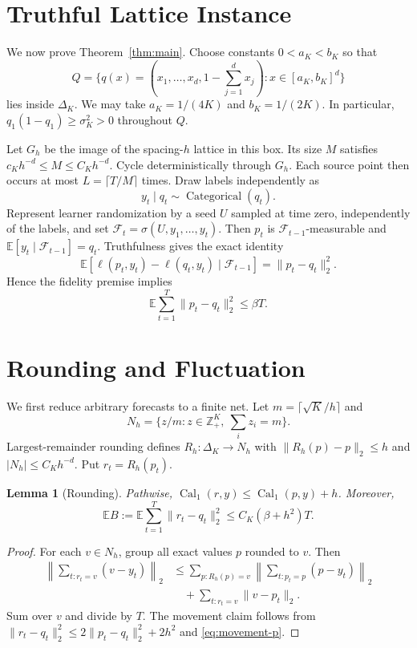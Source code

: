 \documentclass[twoside]{article}
\newtheorem{lemma}{Lemma}
\newcommand{\E}{\mathbb E}
\newcommand{\calone}{\operatorname{Cal}_1}
\newcommand{\simplex}{\Delta_K}
\newcommand{\1}{\mathbf 1}
\begin{document}
\section{Truthful Lattice Instance}

We now prove Theorem~\ref{thm:main}. Choose constants $0<a_K<b_K$ so that \[ Q=\{q(x)=(x_1,\ldots,x_d,1-\textstyle\sum_{j=1}^d x_j): x\in[a_K,b_K]^d\} \] lies inside $\simplex$. We may take $a_K=1/(4K)$ and $b_K=1/(2K)$. In particular, $q_1(1-q_1)\geq\sigma_K^2>0$ throughout $Q$.

Let $G_h$ be the image of the spacing-$h$ lattice in this box. Its size $M$ satisfies $c_Kh^{-d}\leq M\leq C_Kh^{-d}$. Cycle deterministically through $G_h$. Each source point then occurs at most $L=\lceil T/M\rceil$ times. Draw labels independently as \[ y_t\mid q_t\sim\operatorname{Categorical}(q_t). \] Represent learner randomization by a seed $U$ sampled at time zero, independently of the labels, and set $\mathcal F_t=\sigma(U,y_1,\ldots,y_t)$. Then $p_t$ is $\mathcal F_{t-1}$-measurable and $\E[y_t\mid\mathcal F_{t-1}]=q_t$. Truthfulness gives the exact identity \[ \E[\ell(p_t,y_t)-\ell(q_t,y_t)\mid\mathcal F_{t-1}] =\|p_t-q_t\|_2^2. \] Hence the fidelity premise implies
\begin{equation}\label{eq:movement-p}
 \E\sum_{t=1}^T\|p_t-q_t\|_2^2\leq\beta T.
\end{equation}

\section{Rounding and Fluctuation}

We first reduce arbitrary forecasts to a finite net. Let $m=\lceil\sqrt K/h\rceil$ and \[ N_h=\{z/m:z\in\mathbb Z_+^K,\ \sum_i z_i=m\}. \] Largest-remainder rounding defines $R_h:\simplex\to N_h$ with $\|R_h(p)-p\|_2\leq h$ and $|N_h|\leq C_Kh^{-d}$. Put $r_t=R_h(p_t)$.

\begin{lemma}[Rounding]\label{lem:rounding}
Pathwise, $\calone(r,y)\leq\calone(p,y)+h$. Moreover, \[ \E B:=\E\sum_{t=1}^T\|r_t-q_t\|_2^2 \leq C_K(\beta+h^2)T. \]
\end{lemma}

\begin{proof}
For each $v\in N_h$, group all exact values $p$ rounded to $v$. Then
\begin{align*}
 \left\|\sum_{t:r_t=v}(v-y_t)\right\|_2
 &\leq\sum_{p:R_h(p)=v}
 \left\|\sum_{t:p_t=p}(p-y_t)\right\|_2\\
 &\quad+\sum_{t:r_t=v}\|v-p_t\|_2.
\end{align*}
Sum over $v$ and divide by $T$. The movement claim follows from $\|r_t-q_t\|_2^2\leq2\|p_t-q_t\|_2^2+2h^2$ and \eqref{eq:movement-p}.
\end{proof}
\end{document}
